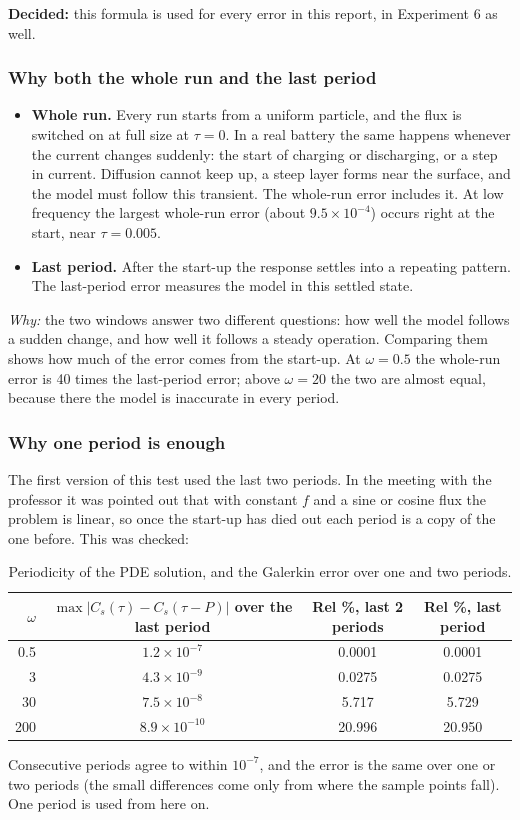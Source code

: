 \documentclass[11pt,a4paper]{article}
\newcommand{\why}{\textit{Why:} }
\newcommand{\decided}[1]{\textcolor{green!40!black}{\textbf{Decided:} #1}}
\begin{document}
\decided{this formula is used for every error in this report, in Experiment 6 as well.}

\subsubsection{Why both the whole run and the last period}
\begin{itemize}
  \item \textbf{Whole run.} Every run starts from a uniform particle, and the flux is switched on at full size at $\tau=0$. In a real battery the same happens whenever the current changes suddenly: the start of charging or discharging, or a step in current. Diffusion cannot keep up, a steep layer forms near the surface, and the model must follow this transient. The whole-run error includes it. At low frequency the largest whole-run error (about $9.5\times10^{-4}$) occurs right at the start, near $\tau=0.005$.
  \item \textbf{Last period.} After the start-up the response settles into a repeating pattern. The last-period error measures the model in this settled state.
\end{itemize}
\why the two windows answer two different questions: how well the model follows a sudden change, and how well it follows a steady operation. Comparing them shows how much of the error comes from the start-up. At $\omega=0.5$ the whole-run error is 40 times the last-period error; above $\omega=20$ the two are almost equal, because there the model is inaccurate in every period.

\subsubsection{Why one period is enough}
The first version of this test used the last two periods. In the meeting with the professor it was pointed out that with constant $f$ and a sine or cosine flux the problem is linear, so once the start-up has died out each period is a copy of the one before. This was checked:
\begin{table}[H]\centering\small
\begin{tabular}{rccc}\toprule
$\omega$ & $\max|C_s(\tau)-C_s(\tau-P)|$ over the last period & Rel \%, last 2 periods & Rel \%, last period\\\midrule
0.5 & $1.2\times10^{-7}$ & 0.0001 & 0.0001\\
3 & $4.3\times10^{-9}$ & 0.0275 & 0.0275\\
30 & $7.5\times10^{-8}$ & 5.717 & 5.729\\
200 & $8.9\times10^{-10}$ & 20.996 & 20.950\\\bottomrule
\end{tabular}
\caption{Periodicity of the PDE solution, and the Galerkin error over one and two periods.}
\end{table}
Consecutive periods agree to within $10^{-7}$, and the error is the same over one or two periods (the small differences come only from where the sample points fall). One period is used from here on.
\end{document}
